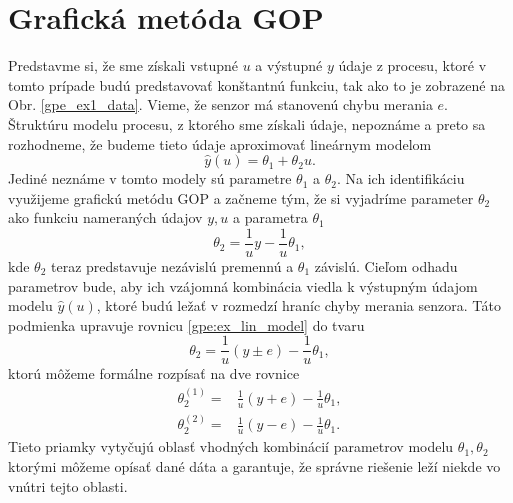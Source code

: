\section{Grafická metóda GOP}
Predstavme si, že sme získali vstupné $ u $ a výstupné $ y $ údaje z procesu, ktoré v tomto prípade budú predstavovať konštantnú funkciu, tak ako to je zobrazené na Obr. \ref{gpe_ex1_data}. Vieme, že senzor má stanovenú chybu merania $ e $. Štruktúru modelu procesu, z ktorého sme získali údaje, nepoznáme a preto sa rozhodneme, že budeme tieto údaje aproximovať lineárnym modelom
\begin{equation}
	\hat{y}(u) = \theta_1 + \theta_2u.
\end{equation}
 Jediné neznáme v tomto modely sú parametre $ \theta_1 $ a $ \theta_2 $. Na ich identifikáciu využijeme grafickú metódu GOP a začneme tým, že si vyjadríme parameter $ \theta_2 $ ako funkciu nameraných údajov $ y, u $ a parametra $ \theta_1 $
\begin{equation} \label{gpe:ex_lin_model}
	\theta_2 = \frac{1}{u}y - \frac{1}{u}\theta_1,
\end{equation}
kde $ \theta_2 $ teraz predstavuje nezávislú premennú a $ \theta_1 $ závislú. Cieľom odhadu parametrov bude, aby ich vzájomná kombinácia viedla k výstupným údajom modelu $ \hat{y}(u) $, ktoré budú ležať v rozmedzí hraníc chyby merania senzora. Táto podmienka upravuje rovnicu \ref{gpe:ex_lin_model} do tvaru
\begin{equation} 
	\theta_2 = \frac{1}{u}\left(y \pm e\right) - \frac{1}{u}\theta_1,
\end{equation}
ktorú môžeme formálne rozpísať na dve rovnice 
\begin{equation}
	\begin{split}
		\theta_2^{(1)} =& \frac{1}{u}\left(y + e\right) - \frac{1}{u}\theta_1,\\
		\theta_2^{(2)} =& \frac{1}{u}\left(y - e\right) - \frac{1}{u}\theta_1.
	\end{split} 
\end{equation}
Tieto priamky vytyčujú oblasť vhodných kombinácií parametrov modelu $ \theta_1, \theta_2 $ ktorými môžeme opísať dané dáta a garantuje, že správne riešenie leží niekde vo vnútri tejto oblasti.

